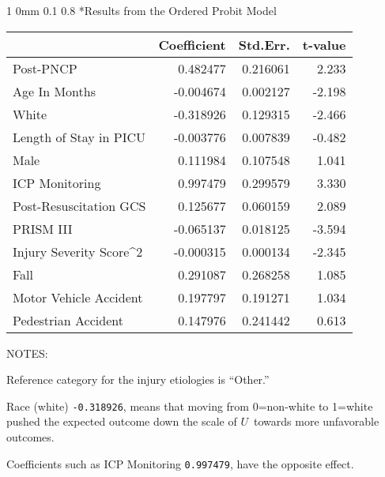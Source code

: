 \documentclass[12pt]{article}
\makeatletter
\newcommand{\9}{\\[9pt]}
\newcommand{\bgm}{\color{MyMath}}
\newcommand{\egm}{\color{white}}
\renewcommand{\section}{\@startsection
	    {section}%
	    {1}%
	    {0mm}%
	    {0.1\baselineskip}%
	    {0.8\baselineskip}%
	    {\newpage \color[cmyk]{0.43,0,0.01,0} \center\LARGE}}%
\makeatother
\begin{document}
\begin{landscape}
\begin{Large}
{\section*{Results from the Ordered Probit Model}
\begin{large}
\begin{center}
\begin{tabular}{lrrr}
                               &  Coefficient   & Std.Err.  & t-value \\
                               \hline
    Post-PNCP                  &     0.482477   & 0.216061  &   2.233 \\
    Age In Months              &    -0.004674   & 0.002127  &  -2.198 \\
    White                      &    -0.318926   & 0.129315  &  -2.466 \\
    Length of Stay in PICU     &    -0.003776   & 0.007839  &  -0.482 \\
    Male                       &     0.111984   & 0.107548  &   1.041 \\
    ICP Monitoring             &     0.997479   & 0.299579  &   3.330 \\
    Post-Resuscitation GCS     &     0.125677   & 0.060159  &   2.089 \\
    PRISM III                  &    -0.065137   & 0.018125  &  -3.594 \\
    Injury Severity Score\^{}2 &    -0.000315   & 0.000134  &  -2.345 \\
    Fall                       &     0.291087   & 0.268258  &   1.085 \\
    Motor Vehicle Accident     &     0.197797   & 0.191271  &   1.034 \\
    Pedestrian Accident        &     0.147976   & 0.241442  &   0.613 \\
                               \hline
\end{tabular}
\end{center}
\end{large}

\vspace{0.7in}
\noindent NOTES:
\begin{ohlist}
    \item   Reference category for the injury etiologies is ``Other.''
    \item   Race (white) \texttt{-0.318926}, means that moving from 0=non-white to 1=white pushed the expected outcome down 
            the scale of \bgm$U$\egm\ towards more unfavorable outcomes.
    \item   Coefficients such as ICP Monitoring \texttt{0.997479}, have the opposite effect. 
\end{ohlist}

}
\end{Large}
\end{landscape}
\end{document}
